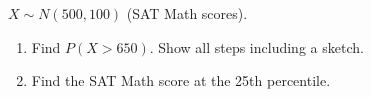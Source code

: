 \documentclass[10pt]{article}
\begin{document}
\vspace{0.1in}

\begin{practicebox}
$X \sim N(500, 100)$ (SAT Math scores).
\begin{enumerate}
  \item Find $P(X > 650)$. Show all steps including a sketch.

        \vspace{1.0in}

  \item Find the SAT Math score at the 25th percentile.

        \vspace{0.8in}
\end{enumerate}
\end{practicebox}
\end{document}
